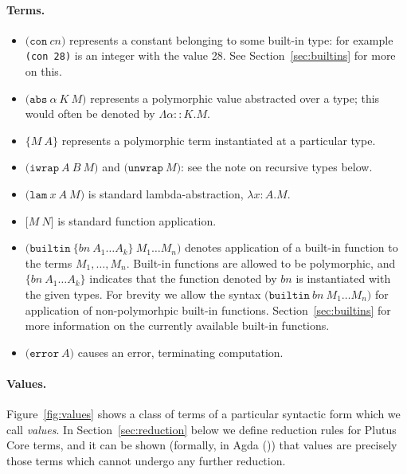 \documentclass[a4paper]{article}
\newcommand{\keyword}[1]{\texttt{#1}}
\newcommand{\construct}[1]{\texttt{(} #1 \texttt{)}}
\newcommand{\con}[1]{\construct{\keyword{con} ~ #1}}
\newcommand{\abs}[3]{\construct{\keyword{abs} ~ #1 ~ #2 ~ #3}}
\newcommand{\inst}[2]{\texttt{\{}#1 ~ #2\texttt{\}}}
\newcommand{\lam}[3]{\construct{\keyword{lam} ~ #1 ~ #2 ~ #3}}
\newcommand{\app}[2]{\texttt{[} #1 ~ #2 \texttt{]}}
\newcommand{\iwrap}[3]{\construct{\keyword{iwrap} ~ #1 ~ #2 ~ #3}}
\newcommand{\unwrap}[1]{\construct{\keyword{unwrap} ~ #1}}
\newcommand{\builtin}[3]{\construct{\keyword{builtin} ~ \texttt{\{} \mathit{#1} ~ #2 \texttt{\}} ~ #3}}
\newcommand{\error}[1]{\construct{\keyword{error} ~ #1}}
\begin{document}
\paragraph{Terms.}
\begin{itemize}
\item $\con{cn}$ represents a constant belonging to some built-in
  type: for example \texttt{(con 28)} is an integer with the value 28.
  See Section~\ref{sec:builtins} for more on this.
\item $\abs{\alpha}{K}{M}$ represents a polymorphic value abstracted
  over a type; this would often be denoted by $\Lambda\alpha{::}K.M$.
\item $\inst{M}{A}$ represents a polymorphic term instantiated at a particular type.
\item $\iwrap{A}{B}{M}$ and $\unwrap{M}$: see the note on recursive types below.
\item $\lam{x}{A}{M}$ is standard lambda-abstraction, $\lambda{}x{:}{A}.{M}$.
\item $\app{M}{N}$ is standard function application.
\item $\builtin{bn}{A_1 \ldots A_k}{M_1 \ldots M_n}$ denotes application of a built-in function
to the terms $M_1, \ldots, M_n$.
Built-in functions are allowed to be polymorphic, and
$\texttt{\{}\mathit{bn} ~ A_1 \ldots A_k\texttt{\}}$ indicates that the
function denoted by $\mathit{bn}$ is instantiated with the given
types.  For brevity we allow the syntax
$\construct{\keyword{builtin} ~ \mathit{bn} ~ M_1 \ldots M_n}$ for
application of non-polymorhpic built-in functions.
Section~\ref{sec:builtins} for more information on the currently
available built-in functions.
\item $\error{A}$ causes an error, terminating computation.
\end{itemize}

\paragraph{Values.} Figure~\ref{fig:values} shows a class of terms of a particular
syntactic form which we call \textit{values}.  In
Section~\ref{sec:reduction} below we define reduction rules for Plutus
Core terms, and it can be shown (formally, in
Agda (\cite{Plutus-metatheory-repo})) that values are precisely those
terms which cannot undergo any further reduction.
\end{document}
